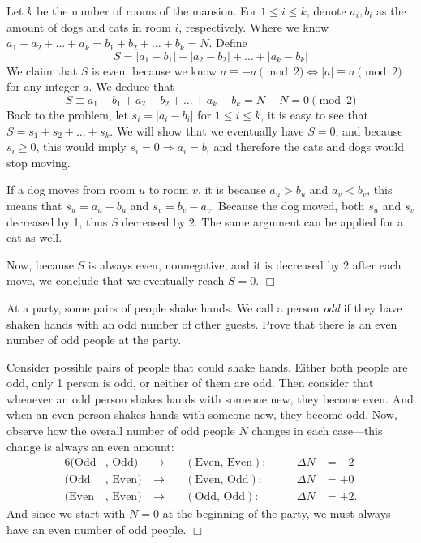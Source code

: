 \begin{solution} 
    Let $k$ be the number of rooms of the mansion. For $1 \leq i \leq k$, denote $a_i, b_i$ as the amount of dogs and cats in room $i$, respectively. 
    Where we know $a_1 + a_2 + \ldots +a_k = b_1 + b_2 + \ldots + b_k = N $. Define
    $$S = |a_1 - b_1| + |a_2 - b_2| + \ldots + |a_k - b_k|$$
    We claim that $S$ is even, because we know $a \equiv -a \pmod 2 \iff |a| \equiv a \pmod 2$ for any integer $a$. We deduce  that 
    $$S \equiv a_1 - b_1 + a_2 - b_2 + \ldots + a_k - b_k = N - N = 0 \pmod 2$$
    Back to the problem, let $s_i = |a_i - b_i|$ for $1 \leq i \leq k$, it is easy to see that $S = s_1 + s_2 + \ldots + s_k$. We will show that we eventually have $S=0$, and because $s_i \geq 0$, this would imply $s_i=0 \Rightarrow a_i = b_i$ and therefore the cats and dogs would stop moving.

    If a dog moves from room $u$ to room $v$, it is because $a_u > b_u$ and $a_v < b_v$, this means that $s_u = a_u - b_u$ and $s_v = b_v - a_v$. Because the dog moved, both $s_u$ and $s_v$ decreased by 1, thus $S$ decreased by $2$. The same argument can be applied for a cat as well.

    Now, because $S$ is always even, nonnegative, and it is decreased by $2$ after each move, we conclude that we eventually reach $S = 0$. $\Box$
    
\end{solution}
 
\begin{problem}
    At a party, some pairs of people shake hands. We call a person \emph{odd} if they have shaken hands with an odd number of other guests. Prove that there is an even number of odd people at the party.
\end{problem}

\begin{solution}
    Consider possible pairs of people that could shake hands. Either both people are odd, only 1 person is odd, or neither of them are odd. Then consider that whenever an odd person shakes hands with someone new, they become even. And when an even person shakes hands with someone new, they become odd. Now, observe how the overall number of odd people $N$ changes in each case---this change is always an even amount:
    \begin{alignat*}{6}
        (\text{Odd} &,\,\text{Odd})& \ \rightarrow&& \ (\text{Even} ,\,\text{Even})\!: \quad &&\Delta N &{}= -2\\
        (\text{Odd} &,\,\text{Even})& \ \rightarrow&& \ (\text{Even},\,\text{Odd})\!: \quad &&\Delta N &{}= +0\\
        (\text{Even} &,\,\text{Even})& \ \rightarrow&& \ (\text{Odd},\,\text{Odd})\!: \quad &&\Delta N &{}= +2.
    \end{alignat*}
    And since we start with $N=0$ at the beginning of the party, we must always have an even number of odd people. $\Box$
\end{solution}

